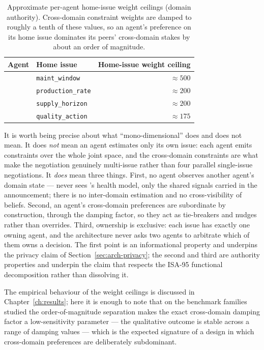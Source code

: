\begin{table}[ht]
\centering
\caption{Approximate per-agent home-issue weight ceilings (domain
authority). Cross-domain constraint weights are damped to roughly a
tenth of these values, so an agent's preference on its home issue
dominates its peers' cross-domain stakes by about an order of
magnitude.}
\label{tab:ceilings}
\small
\begin{tabular}{@{}l l r@{}}
\toprule
\textbf{Agent} & \textbf{Home issue} & \textbf{Home-issue weight ceiling} \\
\midrule
\PMA{} & \texttt{maint\_window}     & $\approx 500$ \\
\PSA{} & \texttt{production\_rate}  & $\approx 200$ \\
\SCA{} & \texttt{supply\_horizon}   & $\approx 200$ \\
\QCA{} & \texttt{quality\_action}   & $\approx 175$ \\
\bottomrule
\end{tabular}
\end{table}

It is worth being precise about what ``mono-dimensional'' does and does
not mean. It does \emph{not} mean an agent estimates only its own
issue: each agent emits constraints over the whole joint space, and the
cross-domain constraints are what make the negotiation genuinely
multi-issue rather than four parallel single-issue negotiations. It
\emph{does} mean three things. First, no agent observes another agent's
domain state --- \PSA{} never sees \PMA{}'s health model, only the
shared signals carried in the announcement; there is no inter-domain
estimation and no cross-visibility of beliefs. Second, an agent's
cross-domain preferences are subordinate by construction, through the
damping factor, so they act as tie-breakers and nudges rather than
overrides. Third, ownership is exclusive: each issue has exactly one
owning agent, and the architecture never asks two agents to arbitrate
which of them owns a decision. The first point is an informational
property and underpins the privacy claim of
Section~\ref{sec:arch-privacy}; the second and third are authority
properties and underpin the claim that \NEXUS{} respects the ISA-95
functional decomposition rather than dissolving it.

The empirical behaviour of the weight ceilings is discussed in
Chapter~\ref{ch:results}; here it is enough to note that on the
benchmark families studied the order-of-magnitude separation makes the
exact cross-domain damping factor a low-sensitivity parameter --- the
qualitative outcome is stable across a range of damping values --- which
is the expected signature of a design in which cross-domain preferences
are deliberately subdominant.

